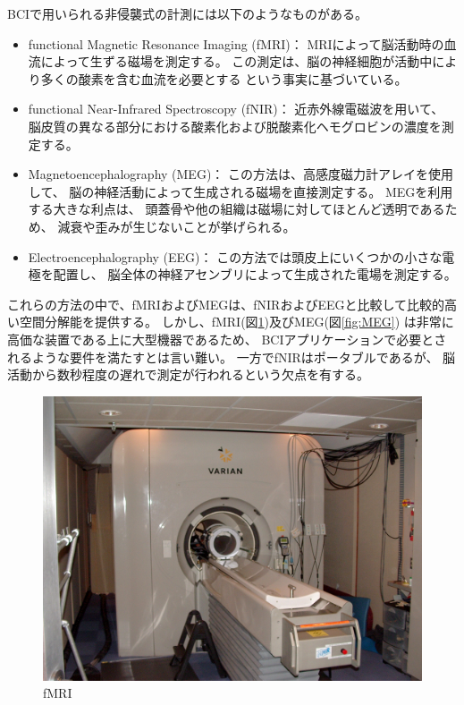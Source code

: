 BCIで用いられる非侵襲式の計測には以下のようなものがある。
\begin{itemize}
    \item functional Magnetic Resonance Imaging (fMRI)：
    MRIによって脳活動時の血流によって生ずる磁場を測定する。
    この測定は、脳の神経細胞が活動中により多くの酸素を含む血流を必要とする
    という事実に基づいている。
    \item functional Near-Infrared Spectroscopy (fNIR)：
    近赤外線電磁波を用いて、
    脳皮質の異なる部分における酸素化および脱酸素化ヘモグロビンの濃度を測定する。
    \item Magnetoencephalography (MEG)：
    この方法は、高感度磁力計アレイを使用して、
    脳の神経活動によって生成される磁場を直接測定する。
    MEGを利用する大きな利点は、
    頭蓋骨や他の組織は磁場に対してほとんど透明であるため、
    減衰や歪みが生じないことが挙げられる。
    \item Electroencephalography (EEG)：
    この方法では頭皮上にいくつかの小さな電極を配置し、
    脳全体の神経アセンブリによって生成された電場を測定する。
\end{itemize}
これらの方法の中で、fMRIおよびMEGは、fNIRおよびEEGと比較して比較的高い空間分解能を提供する\cite{脳を測る}。
しかし、fMRI(図\ref{fig:fMRI})及びMEG(図\ref{fig:MEG})
は非常に高価な装置である上に大型機器であるため、
BCIアプリケーションで必要とされるような要件を満たすとは言い難い。
一方でfNIRはポータブルであるが、
脳活動から数秒程度の遅れで測定が行われるという欠点を有する\cite{脳を測る}。
\begin{figure}
    \begin{center}
    \includegraphics[width=120mm]{images/fMRI.jpg}
    \end{center}
    \caption{fMRI}
    \label{fig:fMRI}
\end{figure}
